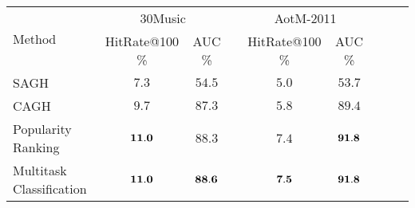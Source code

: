 \begin{tabular}{l*{4}{c}*{4}{c}}
\toprule
\multirow{2}{*}{Method}      & \multicolumn{2}{c}{30Music} && \multicolumn{2}{c}{AotM-2011} \\ \cmidrule{2-3} \cmidrule{5-6}
                             & HitRate@100 \% & AUC \% && HitRate@100 \% & AUC \% \\
\midrule
SAGH &                     \hspace{.2em}$7.3$ & $54.5$ &&          $5.0$ & $53.7$ \\
CAGH &                     \hspace{.2em}$9.7$ & $87.3$ &&          $5.8$ & $89.4$ \\
Popularity Ranking &             ${\bf 11.0}$ & $88.3$ &&          $7.4$ & ${\bf 91.8}$ \\
Multitask Classification & ${\bf 11.0}$ & ${\bf 88.6}$ &&          ${\bf 7.5}$ & ${\bf 91.8}$ \\
\bottomrule
\end{tabular}
